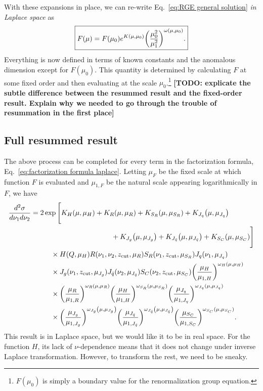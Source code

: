\documentclass[12pt,twoside,class=../reedthesis, crop=false]{standalone}
\providecommand{\zcut}{z_\mathrm{{cut}}}
\begin{document}
	With these expansions in place, we can re-write Eq.~\ref{eq:RGE general solution} \textit{in Laplace space} as
	\begin{equation}\label{eq:NLL RGE solution Laplace}
	\boxed{
		F(\mu) = F(\mu_0) e^{K(\mu, \mu_0)} \qty(\frac{\mu_0^2}{\mu_1^2})^{\omega(\mu, \mu_0)}.
	}
	\end{equation}
	Everything is now defined in terms of known constants and the anomalous dimension except for $F(\mu_0)$. This quantity is determined by calculating $F$ at some fixed order and then evaluating at the scale $\mu_0$.\footnote{$F(\mu_0)$ is simply a boundary value for the renormalization group equation.} {\color{red}\textbf{[TODO: explicate the subtle difference between the resummed result and the fixed-order result. Explain why we needed to go through the trouble of resummation in the first place]}}

\subsection{Full resummed result}
	The above process can be completed for every term in the factorization formula, Eq.~\ref{eq:factorization formula laplace}. Letting $\mu_F$ be the fixed scale at which function $F$ is evaluated and $\mu_{1, F}$ be the natural scale appearing logarithmically in $F$, we have
	\begin{equation}\label{eq:full resummed result Laplace}
	\begin{aligned}
		\frac{d^2\sigma}{d\nu_1 d\nu_2} &= 2 \exp\Bigg[K_H(\mu, \mu_H)  + K_R(\mu, \mu_R) + K_{S_R}(\mu, \mu_{S_R}) + K_{J_q}\qty(\mu, \mu_{J_q})  \\
		&\hspace{4cm}+ K_{J_g}\qty(\mu, \mu_{J_g}) + K_{J_{\bar q}}\qty(\mu, \mu_{J_{\bar q}}) + K_{S_C}(\mu, \mu_{S_C}) \Bigg] \\
		&\hspace{1cm}\times H(Q, \mu_H) R(\nu_1, \nu_2, \zcut, \mu_R) S_R(\nu_1, \zcut, \mu_{S_R}) J_q(\nu_1, \mu_{J_q}) \\
		&\hspace{1cm}\times J_g(\nu_1, \zcut, \mu_{J_g}) J_{\bar q}(\nu_2, \mu_{J_{\bar q}}) S_C(\nu_2, \zcut, \mu_{S_C}) \qty(\frac{\mu_H}{\mu_{1, H}})^{\omega_H(\mu, \mu_H)} \\
		&\hspace{1cm}\times  \qty(\frac{\mu_R}{\mu_{1, R}})^{\omega_R(\mu, \mu_R)} \qty(\frac{\mu_H}{\mu_{1, H}})^{\omega_{S_R}(\mu, \mu_{S_R})} \qty(\frac{\mu_{J_q}}{\mu_{1, J_q}})^{\omega_{J_q}(\mu, \mu_{J_q})} \\
		&\hspace{1cm}\times  \qty(\frac{\mu_{J_g}}{\mu_{1, J_g}})^{\omega_{J_g}\qty(\mu, \mu_{J_g})} \qty(\frac{\mu_{J_{\bar q}}}{\mu_{1, J_{\bar q}}})^{\omega_{J_{\bar q}}\qty(\mu, \mu_{J_{\bar q}})} \qty(\frac{\mu_{S_C}}{\mu_{1, S_C}})^{\omega_{S_C}(\mu, \mu_{S_C})}.
	\end{aligned}
	\end{equation}
	This result is in Laplace space, but we would like it to be in real space. For the function $H$, its lack of $\nu$-dependence means that it does not change under inverse Laplace transformation. However, to transform the rest, we need to be sneaky.
\end{document}

